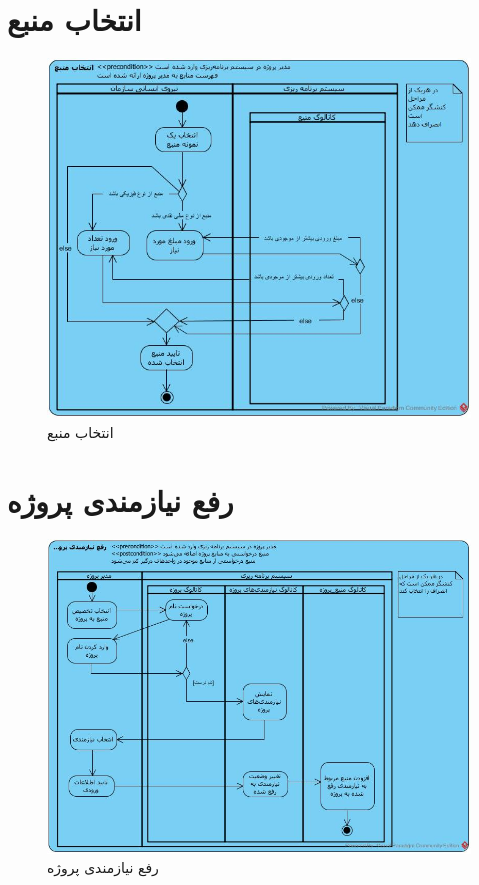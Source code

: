 \section{انتخاب منبع}
\begin{figure}[H]
	\centering
	\includegraphics[scale=0.65]{img/activity/ResourceSelection}
	\caption{انتخاب منبع}
\end{figure}


\section{رفع نیازمندی پروژه}
\begin{figure}[H]
	\centering
	\includegraphics[scale=0.6]{img/activity/SatisfyRequirement}
	\caption{رفع نیازمندی پروژه}
\end{figure}

